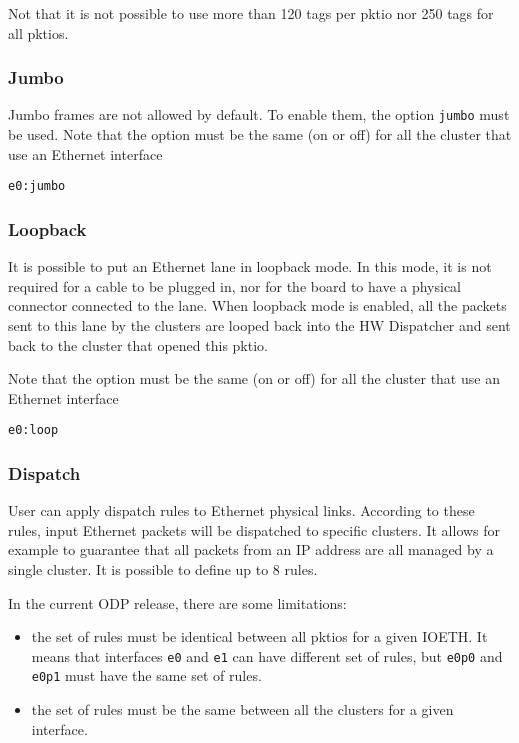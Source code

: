 \documentclass{trkalray}
\begin{document}
Not that it is not possible to use more than 120 tags per pktio nor
250 tags for all pktios.

\subsubsection{Jumbo}

Jumbo frames are not allowed by default. To enable them, the option
\texttt{jumbo} must be used.
Note that the option must be the same (on or off) for all the cluster
that use an Ethernet interface

\begin{lstlisting}
e0:jumbo
\end{lstlisting}

\subsubsection{Loopback}

It is possible to put an Ethernet lane in loopback mode. In this mode,
it is not required for a cable to be plugged in, nor for the board to
have a physical connector connected to the lane.
When loopback mode is enabled, all the packets sent to this lane by
the clusters are looped back into the HW Dispatcher and sent back to
the cluster that opened this pktio.

Note that the option must be the same (on or off) for all the cluster
that use an Ethernet interface

\begin{lstlisting}
e0:loop
\end{lstlisting}

\subsubsection{Dispatch}

User can apply dispatch rules to Ethernet physical links. According to
these rules, input Ethernet packets will be dispatched to specific
clusters. It allows for example to guarantee that all packets from an IP
address are all managed by a single cluster. It is possible to define up
to 8 rules.

In the current ODP release, there are some limitations:
\begin{itemize}
	\item the set of rules must be identical between all pktios for a
		given IOETH. It means that interfaces \texttt{e0} and
		\texttt{e1} can have different set of rules, but \texttt{e0p0}
		and \texttt{e0p1} must have the same set of rules.
	\item the set of rules must be the same between all the clusters for
		a given interface.
\end{itemize}
\end{document}
